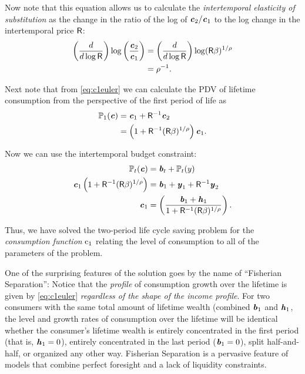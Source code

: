 \documentclass{scrartcl}
\begin{document}
  Now note that this equation allows us to calculate the \textit{intertemporal elasticity of substitution} as the change in the ratio of the log of $\boldsymbol{\mathit{c}}_{2}/\boldsymbol{\mathit{c}}_{1}$ to the log change in the intertemporal price $\mathsf{R}$:
  \begin{equation}\begin{gathered}\begin{aligned} \left(\frac{d}{d \log \mathsf{R}}\right) \log \left(\frac{\boldsymbol{\mathit{c}}_{2}}{\boldsymbol{\mathit{c}}_{1}}\right) & = \left(\frac{d}{d \log \mathsf{R}}\right) \log (\mathsf{R} \beta)^{1/\rho} \\ & = \rho^{-1}.
      \end{aligned}\end{gathered}\end{equation}

  Next note that from \eqref{eq:c1euler} we can calculate the PDV of lifetime consumption from the perspective of the first period of life as
  \begin{equation}\begin{gathered}\begin{aligned} {\mathbb{P}}_{1}(\boldsymbol{\mathit{c}}) & = \boldsymbol{\mathit{c}}_{1} + \mathsf{R}^{-1}\boldsymbol{\mathit{c}}_{2} \\ & = \left(1+\mathsf{R}^{-1}(\mathsf{R}\beta)^{1/\rho}\right)\boldsymbol{\mathit{c}}_{1}.
      \end{aligned}\end{gathered}\end{equation}

  Now we can use the intertemporal budget constraint:
  \begin{equation}\begin{gathered}\begin{aligned} {\mathbb{P}}_{t}(\boldsymbol{\mathit{c}}) & = \boldsymbol{\mathit{b}}_{t}+{\mathbb{P}}_{t}(y) \\ \boldsymbol{\mathit{c}}_{1}\left(1+\mathsf{R}^{-1}(\mathsf{R}\beta)^{1/\rho}\right) & = \boldsymbol{\mathit{b}}_{1}+\boldsymbol{\mathit{y}}_{1}+\mathsf{R}^{-1}\boldsymbol{\mathit{y}}_{2} \\ \boldsymbol{\mathit{c}}_{1} & = \left(\frac{\boldsymbol{\mathit{b}}_{1}+\boldsymbol{\mathit{h}}_{1}}{1+\mathsf{R}^{-1}(\mathsf{R}\beta)^{1/\rho}}\right).
      \end{aligned}\end{gathered}\end{equation}

  Thus, we have solved the two-period life cycle saving problem for the \textit{consumption function} $\mathrm{c}_{1}$ relating the level of consumption to all of the parameters of the problem.

  One of the surprising features of the solution goes by the name of ``Fisherian Separation'': Notice that the \textit{profile} of consumption growth over the lifetime is given by \eqref{eq:c1euler} \textit{regardless of the shape of the income profile}.  For two consumers with the same total amount of lifetime wealth (combined $\boldsymbol{\mathit{b}}_{1}$ and $\boldsymbol{\mathit{h}}_{1}$, the level and growth rates of consumption over the lifetime will be identical whether the consumer's lifetime wealth is entirely concentrated in the first period (that is, $\boldsymbol{\mathit{h}}_{1}=0$), entirely concentrated in the last period ($\boldsymbol{\mathit{b}}_{1}=0$), split half-and-half, or organized any other way. Fisherian Separation is a pervasive feature of models that combine perfect foresight and a lack of liquidity constraints.
\end{document}
